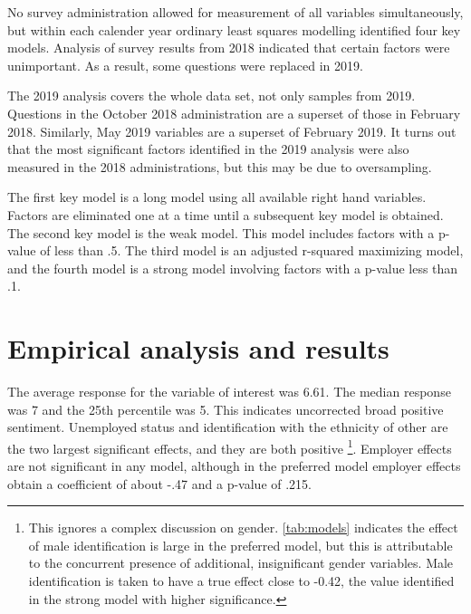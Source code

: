 \documentclass[AER]{./aea-latex-templates/AEA}
\begin{document}
        No survey administration allowed for measurement of all variables simultaneously,
        but within each calender year ordinary least squares modelling identified four key models.
        Analysis of survey results from 2018 indicated that certain factors were unimportant.
        As a result, some questions were replaced in 2019.

        The 2019 analysis covers the whole data set, not only samples from 2019.
        Questions in the October 2018 administration are a superset of those in February 2018.
        Similarly, May 2019 variables are a superset of February 2019.
        It turns out that the most significant factors identified in the
        2019 analysis were also measured in the 2018 administrations, but this may be due to oversampling.
        
        The first key model is a long model using all available right hand variables.
        Factors are eliminated one at a time until a subsequent key model is obtained.
        The second key model is the weak model. This model includes factors with a p-value of less than .5.
        The third model is an adjusted r-squared maximizing model, and the fourth
        model is a strong model involving factors with a p-value less than .1.

        \section{Empirical analysis and results}

        The average response for the variable of interest was 6.61.
        The median response was 7 and the 25th percentile was 5.
        This indicates uncorrected broad positive sentiment.
        Unemployed status and identification with the ethnicity of
        other are the two largest significant effects, and they are both positive
        \footnote{
            This ignores a complex discussion on gender. 
            \ref{tab:models} indicates the effect of male identification is
            large in the preferred model, but this is attributable to the
            concurrent presence of additional, insignificant gender variables.
            Male identification is taken to have a true effect close to -0.42,
            the value identified in the strong model with higher significance.
        }.
        Employer effects are not significant in any model, although in the preferred
        model employer effects obtain a coefficient of about -.47 and a p-value of .215.
\end{document}
